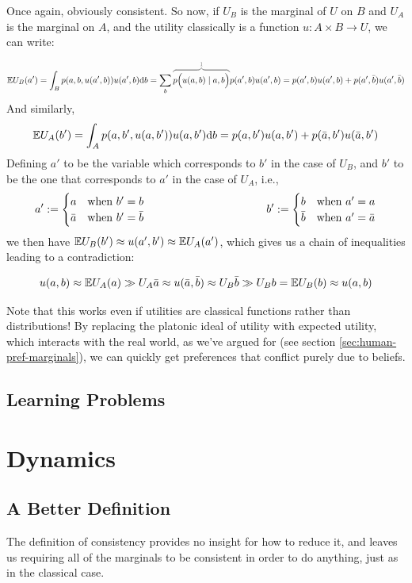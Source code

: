 \documentclass{article}
\begin{document}
	Once again, obviously consistent. So now, if $U_B$ is the marginal of $U$ on $B$ and $U_A$ is the marginal on $A$, and the utility classically is a function $u : A\times B \to U$, we can write:	
	
	\[ \E U_B(a') = \int_B p(a,b, u(a',b)) u(a',b) \mathrm d b = \sum_b  {\color{gray}\overbrace{\color{black} p\Big(u(a,b) \mid a,b\Big)}^{1}} p(a',b) u(a', b) = p(a', b) u(a', b) + p(a', \bar b) u(a', \bar b) \]
	And similarly,
	\[ {\mathbb E} U_A(b') = \int_A p(a,b', u(a,b')) u(a,b') \mathrm d b  = p(a,b') u(a, b') + p(\bar a, b') u(\bar a, b') \]
	Defining $a'$ to be the variable which corresponds to $b'$ in the case of $U_B$, and $b'$ to be the one that corresponds to $a'$ in the case of $U_A$, i.e.,
	\[
		a' := \begin{cases}
			a & \text{when } b' = b \\
			\bar a & \text{when } b' = \bar b
		\end{cases}
		\hspace{1.5in}
		b' := \begin{cases}
		b & \text{when } a' = a \\
		\bar b & \text{when } a' = \bar a
		\end{cases}		
	\]
	we then have ${\mathbb E} U_B (b') \approx u(a',b') \approx {\mathbb E} U_A(a')$, which gives us a chain of inequalities leading to a contradiction:
	
	\[ u(a,b) \approx {\mathbb E} U_A(a) \gg U_A \bar a \approx u(\bar a, \bar b) \approx U_B \bar b \gg U_B b = {\mathbb E} U_B(b) \approx u(a,b) \]
	
	Note that this works even if utilities are classical functions rather than distributions! By replacing the platonic ideal of utility with expected utility, which interacts with the real world, as we've argued for (see section \ref{sec:human-pref-marginals}), we can quickly get preferences that conflict purely due to beliefs.
	
	\subsection{Learning Problems}
	
	\section{Dynamics}
	\subsection{A Better Definition}
	The definition of consistency provides no insight for how to reduce it, and leaves us requiring all of the marginals to be consistent in order to do anything, just as in the classical case. 
	
\end{document}
